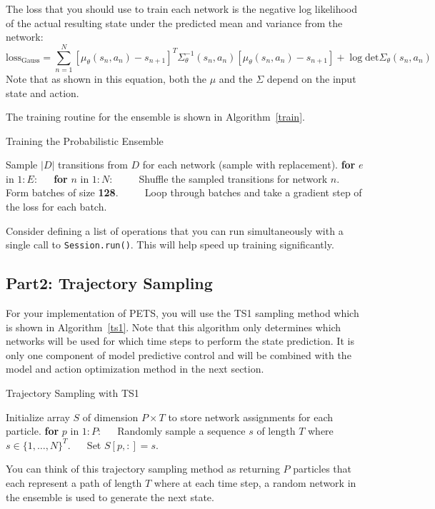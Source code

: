 \documentclass[12pt]{article}
\begin{document}
The loss that you should use to train each network is the negative log likelihood of the actual resulting state under the predicted mean and variance from the network:
\begin{equation}
    \text{loss}_{\text{Gauss}}=\sum_{n=1}^N[\mu_\theta(s_n,a_n)-s_{n+1}]^T\Sigma_\theta^{-1}(s_n, a_n)[\mu_\theta(s_n,a_n)-s_{n+1}] +\log \text{det}\Sigma_\theta(s_n,a_n)
\end{equation}
Note that as shown in this equation, both the $\mu$ and the $\Sigma$ depend on the input state and action.  

The training routine for the ensemble is shown in Algorithm~\ref{train}.
\begin{algorithm}
\caption{Training the Probabilistic Ensemble}\label{train}
\begin{algorithmic}[1]
\State Sample $|D|$ transitions from $D$ for each network (sample with replacement).
\State \textbf{for} $e$ in $1:E$:
\State $\quad$ \textbf{for} $n$ in $1:N$: 
\State $\quad\quad$ Shuffle the sampled transitions for network $n$.
\State $\quad\quad$ Form batches of size \textbf{128}.
\State $\quad\quad$ Loop through batches and take a gradient step of the loss for each batch.
\EndProcedure
\end{algorithmic}
\end{algorithm}
Consider defining a list of operations that you can run simultaneously with a single call to \texttt{Session.run()}.  This will help speed up training significantly.  

\subsection*{Part2: Trajectory Sampling}
For your implementation of PETS, you will use the TS1 sampling method which is shown in Algorithm~\ref{ts1}.  Note that this algorithm only determines which networks will be used for which time steps to perform the state prediction.  It is only one component of model predictive control and will be combined with the model and action optimization method in the next section.  
\begin{algorithm}
\caption{Trajectory Sampling with TS1\label{ts1}}
\begin{algorithmic}[1]
\State Initialize array $S$ of dimension $P\times T$ to store network assignments for each particle.
\State \textbf{for} $p$ in $1:P$:
\State $\quad$ Randomly sample a sequence $s$ of length $T$ where $s\in \{1,\dots,N\}^T$.
\State $\quad$ Set $S[p,:] = s$.
\EndProcedure
\end{algorithmic}
\end{algorithm}
You can think of this trajectory sampling method as returning $P$ particles that each represent a path of length $T$ where at each time step, a random network in the ensemble is used to generate the next state. 
\end{document}
